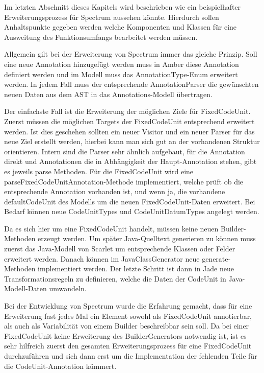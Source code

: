 \documentclass[12pt,oneside,a4paper,parskip]{scrbook}
\begin{document}
Im letzten Abschnitt dieses Kapitels wird beschrieben wie ein beispielhafter Erweiterungsprozess für Spectrum aussehen könnte. Hierdurch sollen Anhaltspunkte gegeben werden welche Komponenten und Klassen für eine Ausweitung des Funktionsumfangs bearbeitet werden müssen.

Allgemein gilt bei der Erweiterung von Spectrum immer das gleiche Prinzip. Soll eine neue Annotation hinzugefügt werden muss in Amber diese Annotation definiert werden und im Modell muss das AnnotationType-Enum erweitert werden. In jedem Fall muss der entsprechende AnnotationParser die gewünschten neuen Daten aus dem AST in das Annotations-Modell übertragen. 

Der einfachste Fall ist die Erweiterung der möglichen Ziele für FixedCodeUnit. Zuerst müssen die möglichen Targets der FixedCodeUnit entsprechend erweitert werden. Ist dies geschehen sollten ein neuer Visitor und ein neuer Parser für das neue Ziel erstellt werden, hierbei kann man sich gut an der vorhandenen Struktur orientieren. Intern sind die Parser sehr ähnlich aufgebaut, für die Annotation direkt und Annotationen die in Abhängigkeit der Haupt-Annotation stehen, gibt es jeweils parse Methoden. Für die FixedCodeUnit wird eine parseFixedCodeUnitAnnotation-Methode implementiert, welche prüft ob die entsprechende Annotation vorhanden ist, und wenn ja, die vorhandene defaultCodeUnit des Modells um die neuen FixedCodeUnit-Daten erweitert. Bei Bedarf können neue CodeUnitTypes und CodeUnitDatumTypes angelegt werden. 

Da es sich hier um eine FixedCodeUnit handelt, müssen keine neuen Builder-Methoden erzeugt werden. Um später Java-Quelltext generieren zu können muss zuerst das Java-Modell von Scarlet um entsprechende Klassen oder Felder erweitert werden. Danach können im JavaClassGenerator neue generate-Methoden implementiert werden. Der letzte Schritt ist dann in Jade neue Transformationsregeln zu definieren, welche die Daten der CodeUnit in Java-Modell-Daten umwandeln.

Bei der Entwicklung von Spectrum wurde die Erfahrung gemacht, dass für eine Erweiterung fast jedes Mal ein Element sowohl als FixedCodeUnit annotierbar, als auch als Variabilität von einem Builder beschreibbar sein soll. Da bei einer FixedCodeUnit keine Erweiterung des BuilderGenerators notwendig ist, ist es sehr hilfreich zuerst den gesamten Erweiterungsprozess für eine FixedCodeUnit durchzuführen und sich dann erst um die Implementation der fehlenden Teile für die CodeUnit-Annotation kümmert.
\end{document}
